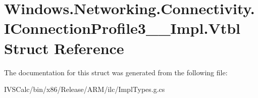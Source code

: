 \hypertarget{struct_windows_1_1_networking_1_1_connectivity_1_1_i_connection_profile3_____impl_1_1_vtbl}{}\section{Windows.\+Networking.\+Connectivity.\+I\+Connection\+Profile3\+\_\+\+\_\+\+Impl.\+Vtbl Struct Reference}
\label{struct_windows_1_1_networking_1_1_connectivity_1_1_i_connection_profile3_____impl_1_1_vtbl}


The documentation for this struct was generated from the following file\+:\begin{DoxyCompactItemize}
\item 
I\+V\+S\+Calc/bin/x86/\+Release/\+A\+R\+M/ilc/Impl\+Types.\+g.\+cs\end{DoxyCompactItemize}

